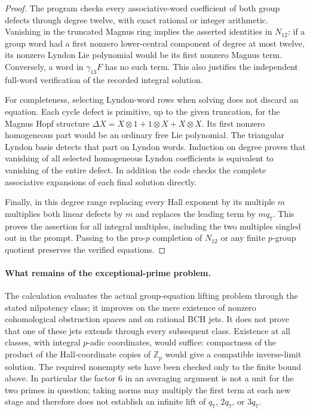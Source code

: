 \begin{proof}
The program checks every associative-word coefficient of both
group defects through degree twelve, with exact rational or
integer arithmetic. Vanishing in the truncated Magnus ring
implies the asserted identities in $N_{12}$: if a group word
had a first nonzero lower-central component of degree at most
twelve, its nonzero Lyndon Lie polynomial would be its first
nonzero Magnus term. Conversely, a word in $\gamma_{13}F$
has no such term. This also justifies the independent full-word
verification of the recorded integral solution.

For completeness, selecting Lyndon-word rows when solving does
not discard an equation. Each cycle defect is primitive, up to
the given truncation, for the Magnus Hopf structure
$\Delta X=X\otimes1+1\otimes X+X\otimes X$.
Its first nonzero homogeneous part would be an ordinary free
Lie polynomial. The triangular Lyndon basis detects that part
on Lyndon words. Induction on degree proves that vanishing of
all selected homogeneous Lyndon coefficients is equivalent to
vanishing of the entire defect. In addition the code checks the
complete associative expansions of each final solution directly.

Finally, in this degree range replacing every Hall exponent by
its multiple $m$ multiplies both linear defects by $m$ and
replaces the leading term by $m q_7$. This proves the assertion
for all integral multiples, including the two multiples singled
out in the prompt. Passing to the pro-$p$ completion of $N_{12}$
or any finite $p$-group quotient preserves the verified equations.
\end{proof}

\paragraph{What remains of the exceptional-prime problem.}
The calculation evaluates the actual group-equation lifting
problem through the stated nilpotency class; it improves on the
mere existence of nonzero cohomological obstruction spaces and
on rational BCH jets. It does not prove that one of these jets
extends through every subsequent class. Existence at all classes,
with integral $p$-adic coordinates, would suffice: compactness of
the product of the Hall-coordinate copies of $\mathbb Z_p$
would give a compatible inverse-limit solution. The required
nonempty sets have been checked only to the finite bound above.
In particular the factor $6$ in an averaging argument is not a
unit for the two primes in question; taking norms may multiply
the first term at each new stage and therefore does not establish
an infinite lift of $q_7$, $2q_7$, or $3q_7$.
